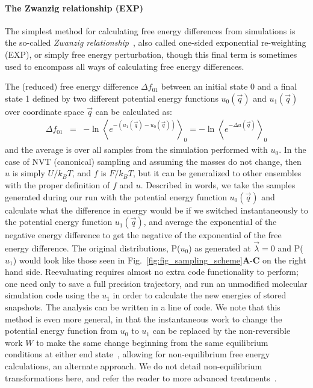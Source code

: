 \documentclass[9pt,bestpractices]{livecoms}
\newcommand{\expect}[1]{\left\langle{#1}\right\rangle}
\begin{document}
\paragraph{The Zwanzig relationship (EXP)}
The simplest method for calculating free energy differences from simulations is the so-called \textit{Zwanzig
relationship}~\cite{zwanzig1954hightemperature}, also called one-sided exponential re-weighting (EXP), or simply free energy perturbation, though this final term is sometimes used to encompass all ways of calculating free energy differences.

The (reduced) free energy difference $\Delta f_{01}$ between an initial state 0 and a final state 1 defined by two different potential energy functions 
$u_0(\vec{q})$ and $u_1(\vec{q})$ over coordinate space $\vec{q}$ can be calculated as:
\begin{eqnarray}
\Delta f_{01} & = & -\ln \expect{e^{-(u_1(\vec{q}) - u_0(\vec{q}))}}_0 =  -\ln \expect{e^{-\Delta u(\vec{q})} }_0
\end{eqnarray}\label{eqn.zwanzig}
and the average is over all samples from the simulation performed with $u_0$. In the case of NVT (canonical) sampling and assuming the masses do not change, then $u$ is simply $U/k_BT$, and $f$ is $F/k_BT$, but it can be generalized to other ensembles with the proper definition of $f$ and $u$.
Described in words, we take the samples generated during our run with the potential energy function $u_0(\vec{q})$ and calculate what the difference in energy would be if we switched instantaneously to the potential energy function $u_1(\vec{q})$, and average the exponential of the negative energy difference to get the negative of the exponential of the free energy difference. The original distributions, P($u_0$) as generated at $\vec{\lambda}=0$ and P($u_1$) would look like those seen in Fig.~\ref{fig:fig_sampling_scheme}\textbf{A}-\textbf{C} on the right hand side. Reevaluating requires almost no extra code functionality to perform; one need only to save a full precision trajectory, and run an unmodified molecular simulation code using the $u_1$ in order to calculate the new energies of stored snapshots. The analysis can be written in a line of code. We note that this method is even more general, in that the instantaneous work to change the potential energy function from $u_0$ to $u_1$ can be replaced by the non-reversible work $W$ to make the same change beginning from the same equilibrium conditions at either end state~\cite{jarzynski1997nonequilibrium,jarzynski1998equilibrium,crooks2000pathensemble}, allowing for non-equilibrium free energy calculations, an alternate approach. We do not detail non-equilibrium transformations here, and refer the reader to more advanced treatments~\cite{maragakis2008bayesian,oberhofer2005biased,procacci2015unbiased,shirts2003equilibrium,ytreberg2004singleensemble, gapsys2020large}.
\end{document}
